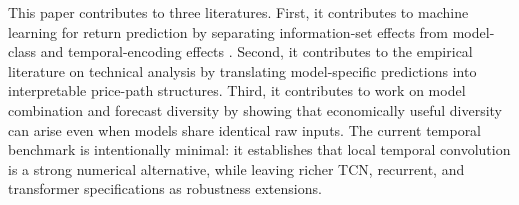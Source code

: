 This paper contributes to three literatures. First, it contributes to machine learning for return prediction by separating information-set effects from model-class and temporal-encoding effects \citep{gu2020empirical}. Second, it contributes to the empirical literature on technical analysis by translating model-specific predictions into interpretable price-path structures. Third, it contributes to work on model combination and forecast diversity by showing that economically useful diversity can arise even when models share identical raw inputs. The current temporal benchmark is intentionally minimal: it establishes that local temporal convolution is a strong numerical alternative, while leaving richer TCN, recurrent, and transformer specifications as robustness extensions.
